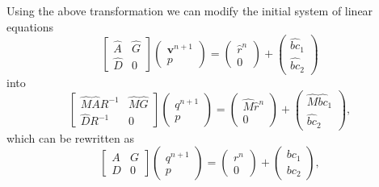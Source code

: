 \documentclass{article}
\begin{document}
Using the above transformation we can modify the initial system of linear equations
\begin{equation}
\left[\begin{array}{ccc}
\hat{A} & \hat{G} \\
\hat{D} & 0 
\end{array}\right]\left(\begin{array}{c}
\boldsymbol{v}^{n+1} \\
p
\end{array}\right)=\left(\begin{array}{c}
\hat{r}^n \\
0 
\end{array}\right)+\left(\begin{array}{c}
\widehat{bc}_1 \\
\widehat{bc}_2 
\end{array}\right)
\end{equation}
into 
\begin{equation}
\left[\begin{array}{cc}
\hat{M}\hat{A}R^{-1} & \hat{M}\hat{G} \\
\hat{D}R^{-1} & 0
\end{array}\right]\left(\begin{array}{c}
q^{n+1} \\
p
\end{array}\right)=\left(\begin{array}{c}
\hat{M}\hat{r}^n \\
0
\end{array}\right)+\left(\begin{array}{c}
\hat{M}\widehat{b c}_1 \\
\widehat{b c}_2
\end{array}\right),
\end{equation}
which can be rewritten as 
\begin{equation}\label{eqn:nse-normalized}
\left[\begin{array}{cc}
A & G \\
D & 0
\end{array}\right]\left(\begin{array}{c}
q^{n+1} \\
p
\end{array}\right)=\left(\begin{array}{c}
r^n \\
0
\end{array}\right)+\left(\begin{array}{c}
{b c}_1 \\
{b c}_2
\end{array}\right),
\end{equation}
\end{document}
